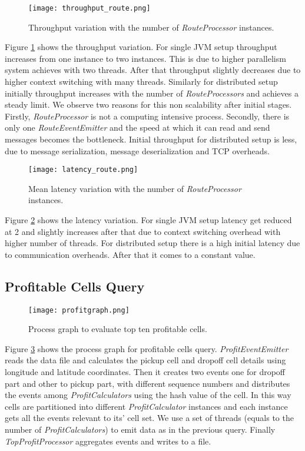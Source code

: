 \begin{figure}[!t]
        \centering
        \texttt{[image: throughput\_route.png]}
        \caption{Throughput variation with the number of \textit{RouteProcessor} instances.}
        \label{throughput_route}
\end{figure}

Figure \ref{throughput_route} shows the throughput variation. For single JVM setup throughput increases from one instance to two instances. This is due to higher parallelism system achieves with two threads. After that throughput slightly decreases due to higher context switching with many threads. Similarly for distributed setup initially throughput increases with the number of   \textit{RouteProcessors} and achieves a steady limit. We observe two reasons for this non scalability after initial stages. Firstly, \textit{RouteProcessor} is not a computing intensive process. Secondly, there is only one \textit{RouteEventEmitter} and the speed at which it can read and send messages becomes the bottleneck. Initial throughput for distributed setup is less, due to message serialization, message deserialization and TCP overheads. 

\begin{figure}[!t]
        \centering
        \texttt{[image: latency\_route.png]}
        \caption{Mean latency variation with the number of \textit{RouteProcessor} instances.}
        \label{latency_route}
\end{figure}

Figure \ref{latency_route} shows the latency variation. For single JVM setup latency get reduced at 2 and slightly increases after that due to context switching overhead with higher number of threads. For distributed setup there is a high initial latency due to communication overheads. After that it comes to a constant value. 

\subsection{Profitable Cells Query}

\begin{figure}[!t]
        \centering
        \texttt{[image: profitgraph.png]}
        \caption{Process graph to evaluate top ten profitable cells.}
        \label{profictgraph}
\end{figure}

Figure \ref{profictgraph} shows the process graph for profitable cells query. \textit{ProfitEventEmitter} reads the data file and calculates the pickup cell and dropoff cell details using longitude and latitude coordinates. Then it creates two events one for dropoff part and other to pickup part, with different sequence numbers and distributes the events among \textit{ProfitCalculators} using the hash value of the cell. In this way cells are partitioned into different \textit{ProfitCalculator} instances and each instance gets all the events relevant to its' cell set. We use a set of threads (equals to the number of \textit{ProfitCalculators}) to emit data as in the previous query. Finally \textit{TopProfitProcessor} aggregates events and writes to a file. 

